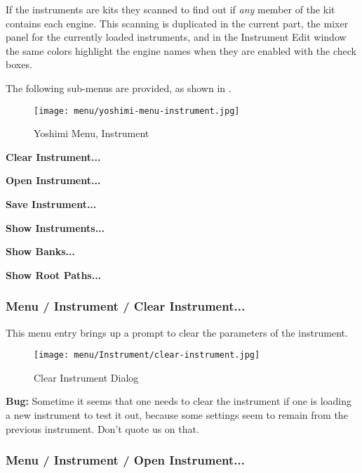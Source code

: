    If the instruments are kits they scanned to find out if 
   \textsl{any} member of the kit contains each engine.
   This scanning is duplicated in the current part, the mixer panel for the
   currently loaded instruments, and in the Instrument Edit window the same
   colors highlight the engine names when they are enabled with the check
   boxes. 

   The following sub-menus are provided, as shown in
   .

\begin{figure}[H]
   \centering 
   \texttt{[image: menu/yoshimi-menu-instrument.jpg]}
   \caption{Yoshimi Menu, Instrument}
   \label{fig:yoshimi_instrument_menu}
\end{figure}

   \begin{enumber}
      \item \textbf{Clear Instrument...}
      \item \textbf{Open Instrument...}
      \item \textbf{Save Instrument...}
      \item \textbf{Show Instruments...}
      \item \textbf{Show Banks...}
      \item \textbf{Show Root Paths...}
   \end{enumber}

\subsubsection{Menu / Instrument / Clear Instrument...}
\label{subsubsec:menu_instrument_clear}

   This menu entry brings up a prompt to clear the parameters of the
   instrument.

\begin{figure}[H]
   \centering 
   \texttt{[image: menu/Instrument/clear-instrument.jpg]}
   \caption{Clear Instrument Dialog}
   \label{fig:clear_instrument_dialog}
\end{figure}

   \textbf{Bug:}
   Sometime it seems that one needs to clear the instrument if one is
   loading a new instrument to test it out, because some settings seem
   to remain from the previous instrument.  Don't quote us on that.

\subsubsection{Menu / Instrument / Open Instrument...}
\label{subsubsec:menu_instrument_open}

